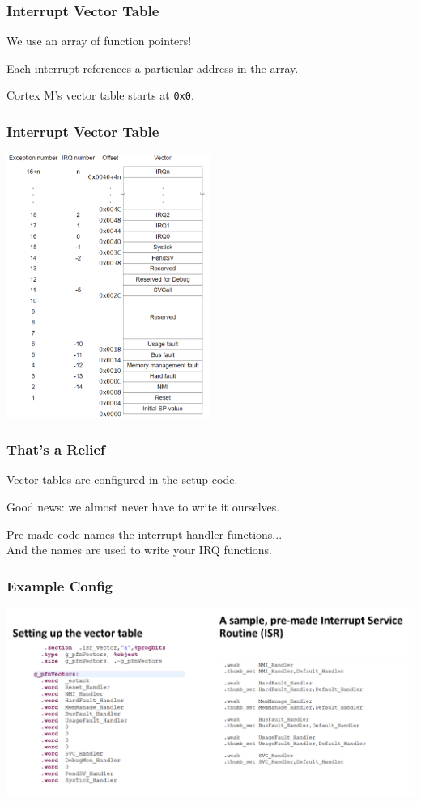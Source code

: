 \begin{frame}
\frametitle{Interrupt Vector Table}

We use an array of function pointers!

Each interrupt references a particular address in the array.

Cortex M's vector table starts at \texttt{0x0}.


\end{frame}

\begin{frame}
\frametitle{Interrupt Vector Table}

\begin{center}
	\includegraphics[width=0.5\textwidth]{images/ivt.png}
\end{center}

\end{frame}

\begin{frame}
\frametitle{That's a Relief}

Vector tables are configured in the setup code.

Good news: we almost never have to write it ourselves.

Pre-made code names the interrupt handler functions...\\
\quad And the names are used to write your IRQ functions.


\end{frame}

\begin{frame}
\frametitle{Example Config}

\begin{center}
	\includegraphics[width=\textwidth]{images/example-irq-config.png}
\end{center}


\end{frame}

